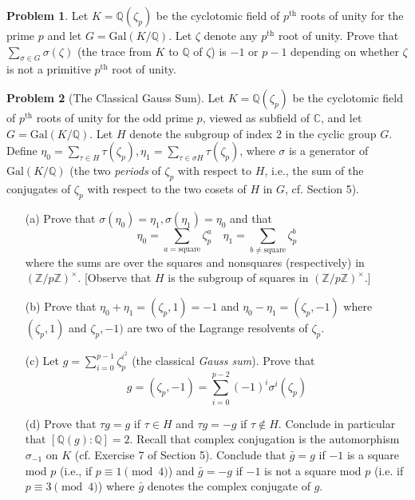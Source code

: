 \documentclass{article}
\theoremstyle{definition}
\newtheorem{prob}{Problem}
\newcommand{\CC}{\mathbb C}
\newcommand{\QQ}{\mathbb Q}
\newcommand{\ZZ}{\mathbb Z}
\newcommand{\Gal}{\text{Gal}}
\begin{document}
\setcounter{prob}{9}
\begin{prob}
	Let $K = \QQ(\zeta_p)$ be the cyclotomic field of $p^{\text{th}}$ roots of unity for the prime $p$ and let $G = \Gal(K/\QQ)$.
	Let $\zeta$ denote any $p^{\text{th}}$ root of unity.
	Prove that $\sum_{\sigma \in G} \sigma(\zeta)$ (the trace from $K$ to $\QQ$ of $\zeta$) is $-1$ or $p - 1$ depending on whether $\zeta$ is not a primitive $p^{\text{th}}$ root of unity.
\end{prob}

\setcounter{prob}{10}
\begin{prob}[The Classical Gauss Sum]
	Let $K = \QQ(\zeta_p)$ be the cyclotomic field of $p^{\text{th}}$ roots of unity for the odd prime $p$, viewed as subfield of $\CC$, and let $G = \Gal(K/\QQ)$.
	Let $H$ denote the subgroup of index 2 in the cyclic group $G$.
	Define $\eta_0 = \sum_{\tau \in H} \tau(\zeta_p), \eta_1 = \sum_{\tau \in \sigma H} \tau(\zeta_p)$, where $\sigma$ is a generator of $\Gal(K/\QQ)$ (the two \textit{periods} of $\zeta_p$ with respect to $H$, i.e., the sum of the conjugates of $\zeta_p$ with respect to the two cosets of $H$ in $G$, cf. Section 5).

	\begin{enumerate}
		\item[(a)] Prove that $\sigma(\eta_0) = \eta_1, \sigma(\eta_1) = \eta_0$ and that 
			\[
				\eta_0 = \sum_{a = \text{square}} \zeta_p^a \quad \eta_1 = \sum_{b \neq \text{square}} \zeta_p^b
			\]
			where the sums are over the squares and nonsquares (respectively) in $(\ZZ/p \ZZ)^\times$.
			[Observe that $H$ is the subgroup of squares in $(\ZZ/p \ZZ)^\times$.]

		\item[(b)] Prove that $\eta_0 + \eta_1 = (\zeta_p, 1) = -1$ and $\eta_0 - \eta_1 = (\zeta_p, -1)$ where $(\zeta_p, 1)$ and $\zeta_p, -1)$ are two of the Lagrange resolvents of $\zeta_p$.

		\item[(c)] Let $g = \sum_{i = 0}^{p - 1} \zeta_p^{i^2}$ (the classical \textit{Gauss sum}).
			Prove that
			\[
				g = (\zeta_p, -1) = \sum_{i = 0}^{p - 2} (-1)^i \sigma^i (\zeta_p)
			\]

		\item[(d)] Prove that $\tau g = g$ if $\tau \in H$ and $\tau g = -g$ if $\tau \notin H$.
			Conclude in particular that $[\QQ(g):\QQ] = 2$.
			Recall that complex conjugation is the automorphism $\sigma_{-1}$ on $K$ (cf. Exercise 7 of Section 5).
			Conclude that $\bar{g} = g$ if $-1$ is a square mod $p$ (i.e., if $p \equiv 1 \pmod{4}$) and $\bar{g} = -g$ if $-1$ is not a square mod $p$ (i.e. if $p \equiv 3 \pmod{4}$) where $\bar{g}$ denotes the complex conjugate of $g$.


\end{enumerate}
\end{prob}
\end{document}
